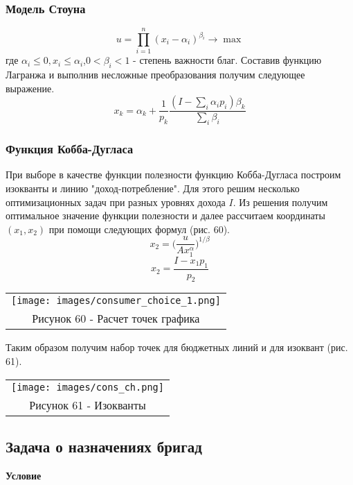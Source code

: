 \documentclass[12pt]{article}
\theoremstyle{definition}
\theoremstyle{remark}
\begin{document}
\subsubsection{Модель Стоуна}
\begin{equation}
  u=\prod_{i=1}^n(x_i-\alpha_i)^{\beta_i}\to\max
\end{equation}
где $\alpha_i\leqslant 0, x_i\leqslant \alpha_i$,$0<\beta_i<1$ - степень важности благ.
Составив функцию Лагранжа и выполнив несложные преобразования получим следующее выражение.
\begin{equation}
x_k=\alpha_k+\dfrac{1}{p_k}\dfrac{(I-\sum_i\alpha_i p_i)\beta_k}{\sum_i\beta_i}
\end{equation}
\subsubsection{Функция Кобба-Дугласа}
При выборе в качестве функции полезности функцию Кобба-Дугласа построим изокванты и линию "доход-потребление". Для этого решим несколько оптимизационных задач при разных уровнях дохода $I$. Из решения получим оптимальное значение функции полезности и далее рассчитаем координаты $(x_1,x_2)$ при помощи следующих формул (рис. 60).
\begin{equation}
  x_2=\bigg(\dfrac{u}{Ax_1^{\alpha}}\bigg)^{1/\beta}
\end{equation}
\begin{equation}
  x_2=\dfrac{I-x_1p_1}{p_2}
\end{equation}
\begin{center}
  \begin{tabular}{c}
\texttt{[image: images/consumer\_choice\_1.png]}\\
Рисунок 60 - Расчет точек графика
\end{tabular}
\end{center}

Таким образом получим набор точек для бюджетных линий и для изоквант (рис. 61).
\begin{center}
  \begin{tabular}{c}
\texttt{[image: images/cons\_ch.png]}\\
Рисунок 61 - Изокванты
\end{tabular}
\end{center}
\subsection{Задача о назначениях бригад}
\textbf{Условие}
\end{document}
